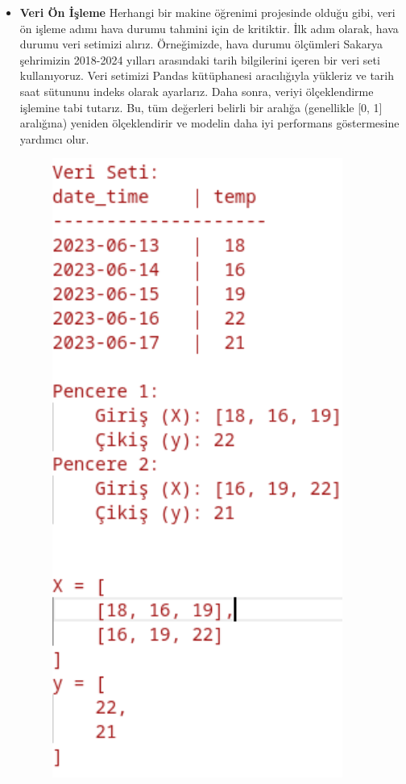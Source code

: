 \documentclass[12pt,a4paper]{article}
\begin{document}
\begin{enumerate}
\begin{itemize}
\begin{itemize}
\begin{figure}[h]
\end{figure}
\item {\bf\fontsize{12pt}{14pt}\selectfont Veri Ön İşleme}   Herhangi bir makine öğrenimi projesinde olduğu gibi, veri ön işleme adımı hava durumu tahmini için de kritiktir. İlk adım olarak, hava durumu veri setimizi alırız. Örneğimizde, hava durumu ölçümleri Sakarya şehrimizin 2018-2024 yılları arasındaki  tarih bilgilerini içeren bir veri seti kullanıyoruz. Veri setimizi Pandas kütüphanesi aracılığıyla yükleriz ve tarih saat sütununu indeks olarak ayarlarız. Daha sonra, veriyi ölçeklendirme işlemine tabi tutarız. Bu, tüm değerleri belirli bir aralığa (genellikle [0, 1] aralığına) yeniden ölçeklendirir ve modelin daha iyi performans göstermesine yardımcı olur\cite{ulasav_hava_durumu}.
\newpage
\begin{figure}[h]
    \centering
    \includegraphics[width=0.9\textwidth,height=0.5\textheight,keepaspectratio]{windowveri1.png}

\end{figure}
\end{itemize}
\end{itemize}
\end{enumerate}
\end{document}
